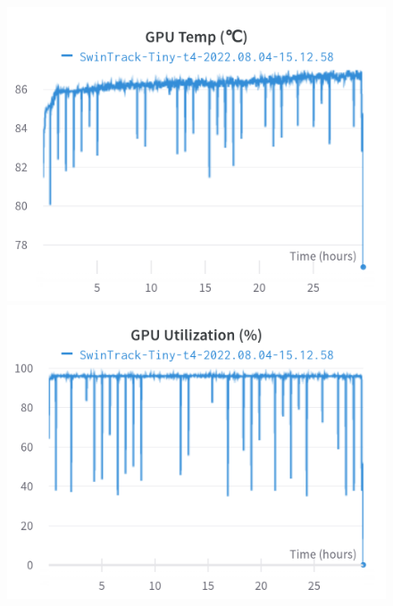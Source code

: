 \documentclass{article}
\begin{document}
\begin{figure}[h]
\includegraphics[width=\linewidth]{charts/Section-4-Panel-10-ez7r8q2s1}
\caption{}
\endminipage\hfill
{}
\includegraphics[width=\linewidth]{charts/Section-4-Panel-11-7ugto7ti8}
\caption{}
\endminipage
\end{figure}
\end{document}
